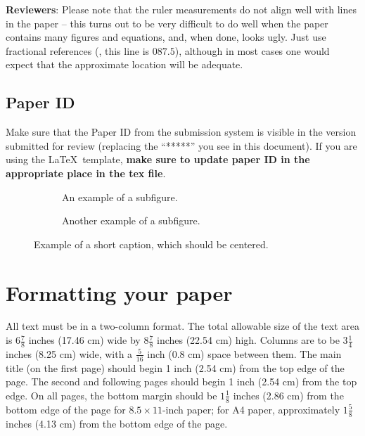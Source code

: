 \documentclass[10pt,twocolumn,letterpaper]{article}
\begin{document}
\textbf{Reviewers}: Please note that the ruler measurements do not align well with lines in the paper -- this turns out to be very difficult to do well when the paper contains many figures and equations, and, when done, looks ugly. Just use fractional references (\eg, this line is $087.5$), although in most cases one would expect that the approximate location will be adequate. 


\subsection{Paper ID}
Make sure that the Paper ID from the submission system is visible in the version submitted for review (replacing the ``*****'' you see in this document). If you are using the \LaTeX\ template, \textbf{make sure to update paper ID in the appropriate place in the tex file}. 



\begin{figure}
  \centering
  \begin{subfigure}{0.68\linewidth}
    \fbox{\rule{0pt}{2in} \rule{.9\linewidth}{0pt}}
    \caption{An example of a subfigure.}
    \label{fig:short-a}
  \end{subfigure}
  \hfill
  \begin{subfigure}{0.28\linewidth}
    \fbox{\rule{0pt}{2in} \rule{.9\linewidth}{0pt}}
    \caption{Another example of a subfigure.}
    \label{fig:short-b}
  \end{subfigure}
  \caption{Example of a short caption, which should be centered.}
  \label{fig:short}
\end{figure}


\section{Formatting your paper}
\label{sec:formatting}

All text must be in a two-column format. The total allowable size of the text area is $6\frac78$ inches (17.46 cm) wide by $8\frac78$ inches (22.54 cm) high. Columns are to be $3\frac14$ inches (8.25 cm) wide, with a $\frac{5}{16}$ inch (0.8 cm) space between them. The main title (on the first page) should begin 1 inch (2.54 cm) from the top edge of the page. The second and following pages should begin 1 inch (2.54 cm) from the top edge. On all pages, the bottom margin should be $1\frac{1}{8}$ inches (2.86 cm) from the bottom edge of the page for $8.5 \times 11$-inch paper; for A4 paper, approximately $1\frac{5}{8}$ inches (4.13 cm) from the bottom edge of the page.
\end{document}
